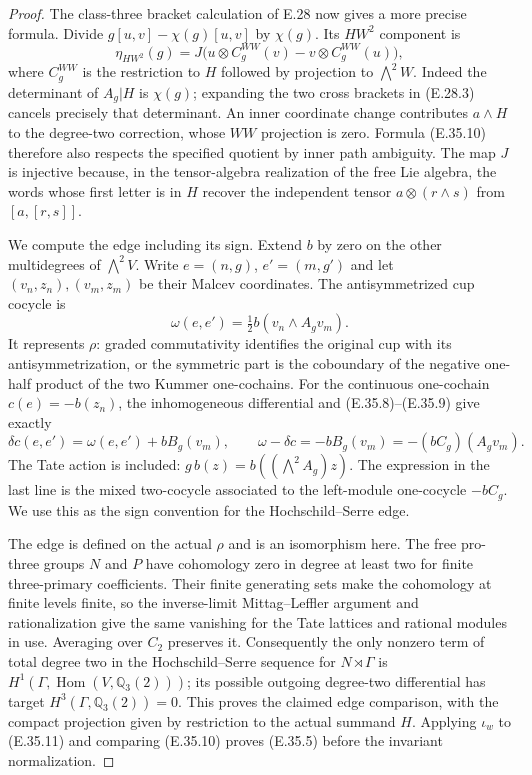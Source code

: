 \begin{proof}
The class-three bracket calculation of E.28 now
gives a more precise formula. Divide
$g[u,v]-\chi(g)[u,v]$ by $\chi(g)$. Its
$HW^2$ component is
\[
 \eta_{HW^2}(g)=
 J\bigl(u\otimes C_g^{WW}(v)
            -v\otimes C_g^{WW}(u)\bigr),
 \tag{E.35.10}
\]
where $C_g^{WW}$ is the restriction to $H$
followed by projection to $\bigwedge^2W$.
Indeed the determinant of $A_g|H$ is $\chi(g)$;
expanding the two cross brackets in (E.28.3)
cancels precisely that determinant. An inner
coordinate change contributes $a\wedge H$
to the degree-two correction, whose $WW$
projection is zero. Formula (E.35.10) therefore
also respects the specified quotient by inner
path ambiguity. The map $J$ is injective because,
in the tensor-algebra realization of the free
Lie algebra, the words whose first letter is
in $H$ recover the independent tensor
$a\otimes(r\wedge s)$ from $[a,[r,s]]$.

We compute the edge including its sign. Extend
$b$ by zero on the other multidegrees of
$\bigwedge^2V$. Write $e=(n,g)$, $e'=(m,g')$
and let $(v_n,z_n),(v_m,z_m)$ be their Malcev
coordinates. The antisymmetrized cup cocycle is
\[
 \omega(e,e')=
       \tfrac12 b(v_n\wedge A_gv_m).
\]
It represents $\rho$: graded commutativity
identifies the original cup with its
antisymmetrization, or the symmetric part is
the coboundary of the negative one-half product
of the two Kummer one-cochains. For the
continuous one-cochain $c(e)=-b(z_n)$, the
inhomogeneous differential and (E.35.8)--(E.35.9)
give exactly
\[
 \delta c(e,e')
    =\omega(e,e')+bB_g(v_m),
 \qquad
 \omega-\delta c=-bB_g(v_m)
                         =-(bC_g)(A_gv_m).
 \tag{E.35.11}
\]
The Tate action is included: $g\,b(z)=
b((\bigwedge^2A_g)z)$. The expression in the
last line is the mixed two-cocycle associated
to the left-module one-cocycle $-bC_g$.
We use this as the sign convention for the
Hochschild--Serre edge.

The edge is defined on the actual $\rho$ and
is an isomorphism here. The free pro-three
groups $N$ and $P$ have cohomology zero in
degree at least two for finite three-primary
coefficients. Their finite generating sets
make the cohomology at finite levels finite,
so the inverse-limit Mittag--Leffler argument
and rationalization give the same vanishing
for the Tate lattices and rational modules in
use. Averaging over $C_2$ preserves it.
Consequently the only nonzero term of total
degree two in the Hochschild--Serre sequence
for $N\rtimes\Gamma$ is
$H^1(\Gamma,\operatorname{Hom}(V,\mathbb Q_3(2)))$;
its possible outgoing degree-two differential
has target $H^3(\Gamma,\mathbb Q_3(2))=0$.
This proves the claimed edge comparison, with
the compact projection given by restriction
to the actual summand $H$. Applying $\iota_w$
to (E.35.11) and comparing (E.35.10) proves
(E.35.5) before the invariant normalization.


\end{proof}
